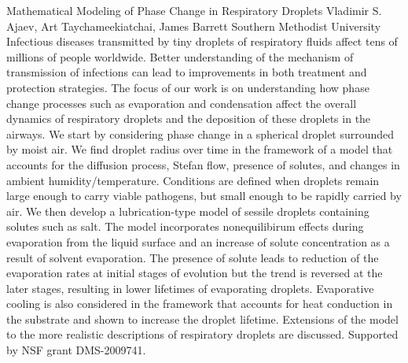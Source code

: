 \begin{addmargin}[2em]{0em}
\vspace{1.5ex}
\abs
{Mathematical Modeling of Phase Change in Respiratory Droplets}
{Vladimir S. Ajaev, Art Taychameekiatchai, James Barrett}
{Southern Methodist University}
{Infectious diseases transmitted by tiny droplets of respiratory fluids affect tens of millions of people worldwide. Better understanding of the mechanism of transmission of infections can lead to improvements in both treatment and protection strategies. The focus of our work is on understanding how phase change processes such as evaporation and condensation affect the overall dynamics of respiratory droplets and the deposition of these droplets in the airways. We start by considering phase change in a spherical droplet surrounded by moist air. We find droplet radius over time in the framework of a model that accounts for the diffusion process, Stefan flow, presence of solutes, and changes in ambient humidity/temperature. Conditions are defined when droplets remain large enough to carry viable pathogens, but small enough to be rapidly carried by air. We then develop a lubrication-type model of sessile droplets containing solutes such as salt. The model incorporates  nonequilibirum effects during evaporation from the liquid surface and an increase of solute concentration as a result of solvent evaporation. The presence of solute leads to reduction of the evaporation rates at initial stages of evolution but the trend is reversed at the later stages, resulting in lower lifetimes of evaporating droplets.  Evaporative cooling is also considered in the framework that accounts for heat conduction in the substrate and shown to increase the droplet lifetime. Extensions of the model to the more realistic descriptions of respiratory droplets are discussed. Supported by NSF grant DMS-2009741.}



\end{addmargin}
